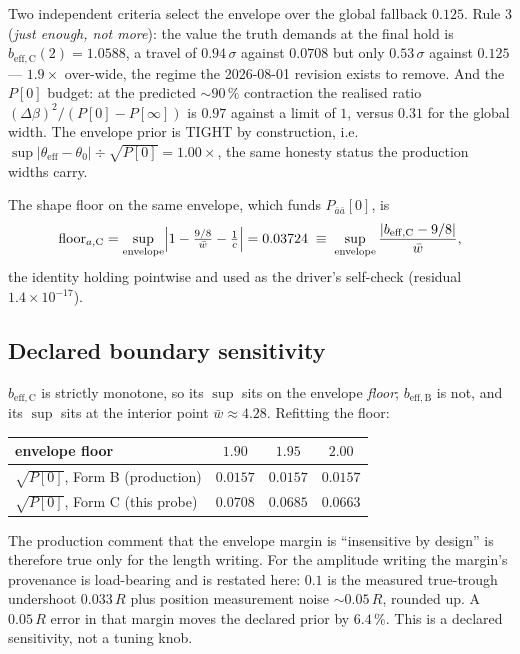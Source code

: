\documentclass[11pt,a4paper,fontset=none]{ctexart}
\begin{document}
Two independent criteria select the envelope over the global fallback
$0.125$. Rule 3 (\emph{just enough, not more}): the value the truth demands at
the final hold is $b_{\mathrm{eff},\text{C}}(2) = 1.0588$, a travel of
$0.94\,\sigma$ against $0.0708$ but only $0.53\,\sigma$ against $0.125$ ---
$1.9\times$ over-wide, the regime the 2026-08-01 revision exists to remove.
And the $P[0]$ budget: at the predicted $\sim\!90\,\%$ contraction the
realised ratio $(\Delta\beta)^2/(P[0]-P[\infty])$ is $0.97$ against a limit of
$1$, versus $0.31$ for the global width. The envelope prior is TIGHT by
construction, i.e.\ $\sup|\theta_{\mathrm{eff}}-\theta_0| \div \sqrt{P[0]}
= 1.00\times$, the same honesty status the production widths carry.

The shape floor on the same envelope, which funds $P_{\bar{a}\bar{a}}[0]$, is
\begin{equation*}
\text{floor}_{a,\text{C}}
 = \sup_{\text{envelope}}\Bigl|1-\tfrac{9/8}{\bar{w}} - \tfrac{1}{c}\Bigr|
 = 0.03724
 \;\equiv\; \sup_{\text{envelope}}
   \frac{|b_{\mathrm{eff},\text{C}} - 9/8|}{\bar{w}} ,
\end{equation*}
the identity holding pointwise and used as the driver's self-check (residual
$1.4\times10^{-17}$).

\subsection*{Declared boundary sensitivity}

$b_{\mathrm{eff},\text{C}}$ is strictly monotone, so its $\sup$ sits on the
envelope \emph{floor}; $b_{\mathrm{eff},\text{B}}$ is not, and its $\sup$ sits
at the interior point $\bar{w} \approx 4.28$. Refitting the floor:

\begin{center}
\begin{tabular}{lccc}
\toprule
envelope floor & $1.90$ & $1.95$ & $2.00$ \\
\midrule
$\sqrt{P[0]}$, Form B (production) & $0.0157$ & $0.0157$ & $0.0157$ \\
$\sqrt{P[0]}$, Form C (this probe) & $0.0708$ & $0.0685$ & $0.0663$ \\
\bottomrule
\end{tabular}
\end{center}

The production comment that the envelope margin is ``insensitive by design''
is therefore true only for the length writing. For the amplitude writing the
margin's provenance is load-bearing and is restated here: $0.1$ is the
measured true-trough undershoot $0.033\,R$ plus position measurement noise
$\sim\!0.05\,R$, rounded up. A $0.05\,R$ error in that margin moves the
declared prior by $6.4\,\%$. This is a declared sensitivity, not a tuning
knob.
\end{document}
